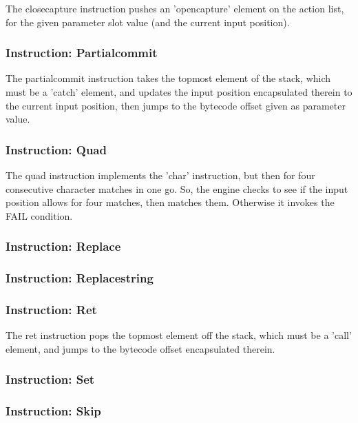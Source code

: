 The closecapture instruction pushes an 'opencapture' element on the
action list, for the given parameter slot value (and the current
input position).

\subsubsection{Instruction: Partialcommit}

The partialcommit instruction takes the topmost element of the stack,
which must be a 'catch' element, and updates the input position
encapsulated therein to the current input position, then jumps to
the bytecode offset given as parameter value.

\subsubsection{Instruction: Quad}

The quad instruction implements the 'char' instruction, but then for
four consecutive character matches in one go. So, the engine checks
to see if the input position allows for four matches, then matches them.
Otherwise it invokes the FAIL condition.

\subsubsection{Instruction: Replace}

\subsubsection{Instruction: Replacestring}

\subsubsection{Instruction: Ret}

The ret instruction pops the topmost element off the stack, which must
be a 'call' element, and jumps to the bytecode offset encapsulated therein.

\subsubsection{Instruction: Set}

\subsubsection{Instruction: Skip}

